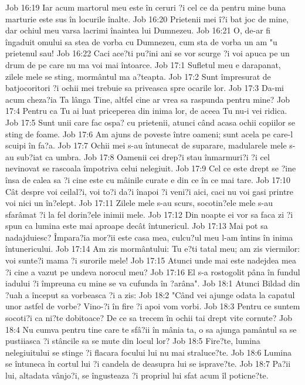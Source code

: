 Job 16:19  Iar acum martorul meu este în ceruri ?i cel ce da pentru mine buna marturie este sus în locurile înalte.
Job 16:20  Prietenii mei î?i bat joc de mine, dar ochiul meu varsa lacrimi înaintea lui Dumnezeu.
Job 16:21  O, de-ar fi îngaduit omului sa stea de vorba cu Dumnezeu, cum sta de vorba un am "u prietenul sau!
Job 16:22  Caci ace?ti pu?ini ani se vor scurge ?i voi apuca pe un drum de pe care nu ma voi mai întoarce.
Job 17:1  Sufletul meu e darapanat, zilele mele se sting, mormântul ma a?teapta.
Job 17:2  Sunt împresurat de batjocoritori ?i ochii mei trebuie sa priveasca spre ocarile lor.
Job 17:3  Da-mi acum cheza?ia Ta lânga Tine, altfel cine ar vrea sa raspunda pentru mine?
Job 17:4  Pentru ca Tu ai luat priceperea din inima lor, de aceea Tu nu-i vei ridica.
Job 17:5  Sunt unii care fac ospa? cu prietenii, atunci când acasa ochii copiilor se sting de foame.
Job 17:6  Am ajuns de poveste între oameni; sunt acela pe care-l scuipi în fa?a.
Job 17:7  Ochii mei s-au întunecat de suparare, madularele mele s-au sub?iat ca umbra.
Job 17:8  Oamenii cei drep?i stau înmarmuri?i ?i cel nevinovat se rascoala împotriva celui nelegiuit.
Job 17:9  Cel ce este drept se ?ine însa de calea sa ?i cine este cu mâinile curate e din ce în ce mai tare.
Job 17:10  Cât despre voi ceilal?i, voi to?i da?i înapoi ?i veni?i aici, caci nu voi gasi printre voi nici un în?elept.
Job 17:11  Zilele mele s-au scurs, socotin?ele mele s-au sfarâmat ?i la fel dorin?ele inimii mele.
Job 17:12  Din noapte ei vor sa faca zi ?i spun ca lumina este mai aproape decât întunericul.
Job 17:13  Mai pot sa nadajduiesc? Împara?ia mor?ii este casa mea, culcu?ul meu l-am întins în inima întunericului.
Job 17:14  Am zis mormântului: Tu e?ti tatal meu; am zis viermilor: voi sunte?i mama ?i surorile mele!
Job 17:15  Atunci unde mai este nadejdea mea ?i cine a vazut pe undeva norocul meu?
Job 17:16  El s-a rostogolit pâna în fundul iadului ?i împreuna cu mine se va cufunda în ?arâna".
Job 18:1  Atunci Bildad din ?uah a început sa vorbeasca ?i a zis:
Job 18:2  "Când vei ajunge odata la capatul unor astfel de vorbe? Vino-?i în fire ?i apoi vom vorbi.
Job 18:3  Pentru ce suntem socoti?i ca ni?te dobitoace? De ce sa trecem în ochii tai drept vite cornute?
Job 18:4  Nu cumva pentru tine care te sfâ?ii în mânia ta, o sa ajunga pamântul sa se pustiiasca ?i stâncile sa se mute din locul lor?
Job 18:5  Fire?te, lumina nelegiuitului se stinge ?i flacara focului lui nu mai straluce?te.
Job 18:6  Lumina se întuneca în cortul lui ?i candela de deasupra lui se isprave?te.
Job 18:7  Pa?ii lui, altadata vânjo?i, se îngusteaza ?i propriul lui sfat acum îl poticne?te.
